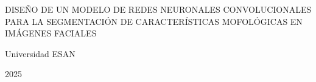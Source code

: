 \begin{center}
	{DISEÑO DE UN MODELO DE REDES NEURONALES CONVOLUCIONALES PARA LA SEGMENTACIÓN DE CARACTERÍSTICAS MOFOLÓGICAS EN IMÁGENES FACIALES}
\end{center}

\leftline{-------------}
\vspace{3cm}

\rightline{\fillin[9cm]}
\vspace{3cm}

\rightline{\fillin[9cm]}
\vspace{3cm}


\centerline{Universidad ESAN}
\centerline{2025}